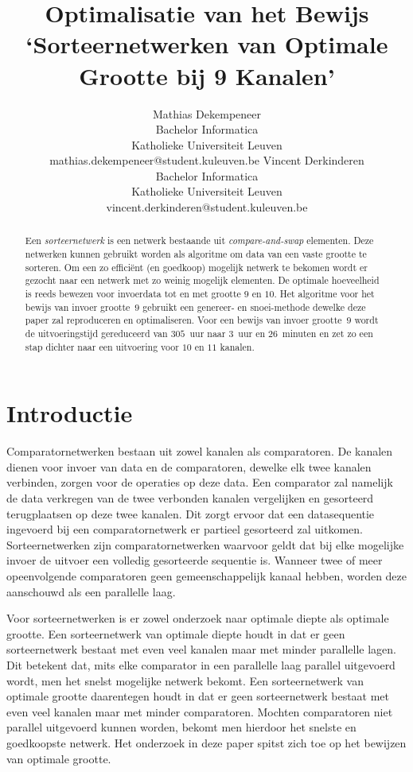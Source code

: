 \documentclass{article}
\title{Optimalisatie van het Bewijs\\ `Sorteernetwerken van Optimale Grootte bij 9 Kanalen'}
\author{Mathias Dekempeneer\\Bachelor Informatica\\Katholieke Universiteit Leuven \\mathias.dekempeneer@student.kuleuven.be
\And
Vincent Derkinderen\\Bachelor Informatica\\Katholieke Universiteit Leuven \\vincent.derkinderen@student.kuleuven.be}
\begin{document}
\maketitle

\begin{abstract}
Een \textit{sorteernetwerk} is een netwerk bestaande uit \textit{compare-and-swap} elementen.
Deze netwerken kunnen gebruikt worden als algoritme om data van een vaste grootte te sorteren.
Om een zo effici\"ent (en goedkoop) mogelijk netwerk te bekomen wordt er gezocht naar een netwerk met zo weinig mogelijk elementen.
De optimale hoeveelheid is reeds bewezen voor invoerdata tot en met grootte $9$ en $10$.
Het algoritme voor het bewijs van invoer grootte~$9$ \cite{sortingNetworksSize2014} gebruikt een genereer- en snoei-methode dewelke deze paper zal reproduceren en optimaliseren.
Voor een bewijs van invoer grootte~$9$ wordt de uitvoeringstijd gereduceerd van $305$~uur naar $3$~uur en $26$~minuten en zet zo een stap dichter naar een uitvoering voor $10$ en $11$ kanalen.
\end{abstract}

\section{Introductie}
Comparatornetwerken bestaan uit zowel kanalen als comparatoren.
De kanalen dienen voor invoer van data en de comparatoren, dewelke elk twee kanalen verbinden, zorgen voor de operaties op deze data.
Een comparator zal namelijk de data verkregen van de twee verbonden kanalen vergelijken en gesorteerd terugplaatsen op deze twee kanalen.
Dit zorgt ervoor dat een datasequentie ingevoerd bij een comparatornetwerk er partieel gesorteerd zal uitkomen.
Sorteernetwerken zijn comparatornetwerken waarvoor geldt dat bij elke mogelijke invoer de uitvoer een volledig gesorteerde sequentie is.
Wanneer twee of meer opeenvolgende comparatoren geen gemeenschappelijk kanaal hebben, worden deze aanschouwd als een parallelle laag. 

Voor sorteernetwerken is er zowel onderzoek naar optimale diepte als optimale grootte.
Een sorteernetwerk van optimale diepte houdt in dat er geen sorteernetwerk bestaat met even veel kanalen maar met minder parallelle lagen.
Dit betekent dat, mits elke comparator in een parallelle laag parallel uitgevoerd wordt, men het snelst mogelijke netwerk bekomt.
Een sorteernetwerk van optimale grootte daarentegen houdt in dat er geen sorteernetwerk bestaat met even veel kanalen maar met minder comparatoren.
Mochten comparatoren niet parallel uitgevoerd kunnen worden, bekomt men hierdoor het snelste en goedkoopste netwerk.
Het onderzoek in deze paper spitst zich toe op het bewijzen van optimale grootte.
\end{document}
